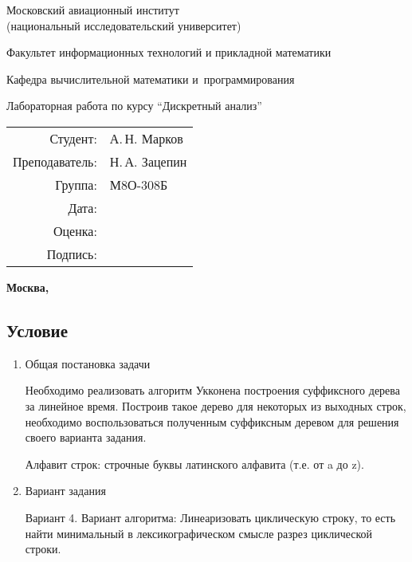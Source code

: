 \documentclass[12pt]{article}
\begin{document}
\thispagestyle{empty}
\begin{center}
    {\Large Московский авиационный институт\\ (национальный исследовательский университет)}

    \vspace{48pt}

    {\large Факультет информационных технологий и прикладной математики}

    \vspace{36pt}

    {\large Кафедра вычислительной математики и~программирования}

    \vspace{48pt}
    
    Лабораторная работа  по курсу \enquote{Дискретный анализ}

\end{center}
    
    \vspace{72pt}
    
    \begin{flushright}
    \begin{tabular}{rl}
    Студент: & А.\,Н. Марков \\
    Преподаватель: & Н.\,А. Зацепин \\
    Группа: & М8О-308Б \\
    Дата: & \\
    Оценка: & \\
    Подпись: & \\
    \end{tabular}
    \end{flushright}
    
    \vfill
    
    \begin{center}
    \bfseries
    Москва, \the\year
\end{center}

\newpage

\subsection*{Условие}
\begin{enumerate}
\item Общая постановка задачи 

Необходимо реализовать алгоритм Укконена построения суффиксного дерева за линейное время. Построив такое дерево для некоторых из выходных строк, необходимо воспользоваться полученным суффиксным деревом для решения своего варианта задания.

Алфавит строк: строчные буквы латинского алфавита (т.е. от a до z).

\item Вариант задания 

Вариант 4. Вариант алгоритма: Линеаризовать циклическую строку, то есть найти минимальный в лексикографическом смысле разрез циклической строки. 

\end{enumerate}
\end{document}
